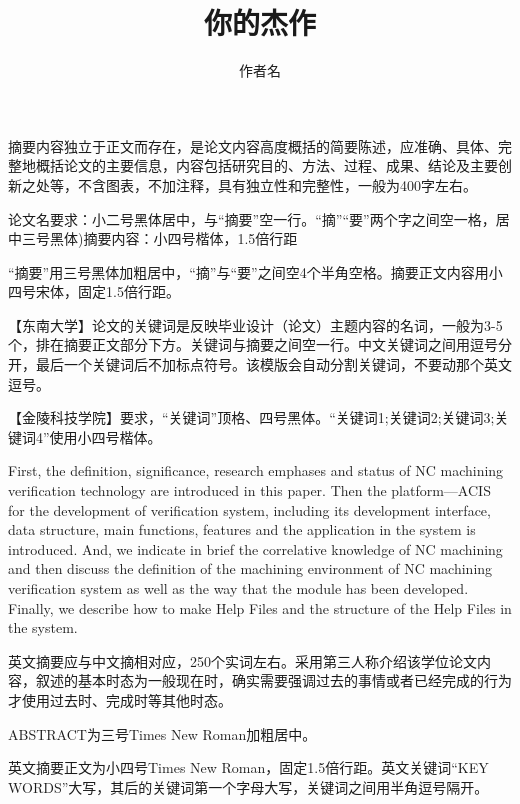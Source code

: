 \documentclass{jitthesis-2026}
\title{你的杰作}{（此栏可删除）}
\author{作者名}
\begin{document}
\maketitle
\frontmatter
\tableofcontents


\begin{abstractCN}
  摘要内容独立于正文而存在，是论文内容高度概括的简要陈述，应准确、具体、完整地概括论文的主要信息，内容包括研究目的、方法、过程、成果、结论及主要创新之处等，不含图表，不加注释，具有独立性和完整性，一般为400字左右。
  
  论文名要求：小二号黑体居中，与“摘要”空一行。“摘”“要”两个字之间空一格，居中三号黑体)摘要内容：小四号楷体，1.5倍行距

  
  “摘要”用三号黑体加粗居中，“摘”与“要”之间空4个半角空格。摘要正文内容用小四号宋体，固定1.5倍行距。
  
  【东南大学】论文的关键词是反映毕业设计（论文）主题内容的名词，一般为3-5个，排在摘要正文部分下方。关键词与摘要之间空一行。中文关键词之间用逗号分开，最后一个关键词后不加标点符号。该模版会自动分割关键词，不要动那个英文逗号。
  
  【金陵科技学院】要求，“关键词”顶格、四号黑体。“关键词1;关键词2;关键词3;关键词4”使用小四号楷体。
\end{abstractCN}


\begin{abstractEN}
  First, the definition, significance, research emphases and status of NC machining verification technology are introduced in this paper. Then the platform—ACIS for the development of verification system, including its development interface, data structure, main functions, features and the application in the system is introduced. And, we indicate in brief the correlative knowledge of NC machining and then discuss the definition of the machining environment of NC machining verification system as well as the way that the module has been developed. Finally, we describe how to make Help Files and the structure of the Help Files in the system.
  
  英文摘要应与中文摘相对应，250个实词左右。采用第三人称介绍该学位论文内容，叙述的基本时态为一般现在时，确实需要强调过去的事情或者已经完成的行为才使用过去时、完成时等其他时态。
  
  ABSTRACT为三号Times New Roman加粗居中。
  
  英文摘要正文为小四号Times New Roman，固定1.5倍行距。英文关键词“KEY WORDS”大写，其后的关键词第一个字母大写，关键词之间用半角逗号隔开。
\end{abstractEN}
\end{document}

